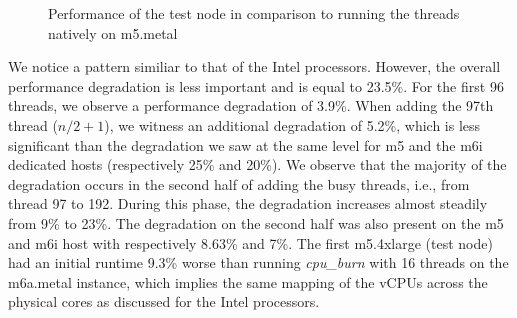 \begin{figure}[H]
\caption{Performance of the test node in comparison to running the threads natively on m5.metal}
\label{fig::m6a_metal_vs_VMs}
\end{figure}
\noindent
We notice a pattern similiar to that of the Intel processors. However, the overall performance degradation is 
less important and is equal to 23.5\%. For the first 96 threads, we observe a performance 
degradation of 3.9\%. When adding the 97th thread ($n/2 + 1$), we witness an additional 
degradation of 5.2\%, which is less significant than the degradation we saw at the same level for 
m5 and the m6i dedicated hosts (respectively 25\% and 20\%). 
We observe that the majority of the degradation occurs in the second half of adding the busy threads, 
i.e., from thread 97 to 192. During this phase, the degradation increases almost steadily 
from 9\% to 23\%. The degradation on the second half was also present on the m5 and m6i host 
with respectively 8.63\% and 7\%. 
The first m5.4xlarge (test node) had an initial runtime 9.3\% worse than running \textit{cpu\_burn} with 
16 threads on the m6a.metal instance, which implies the same mapping of the vCPUs across the physical 
cores as discussed for the Intel processors. \\ 